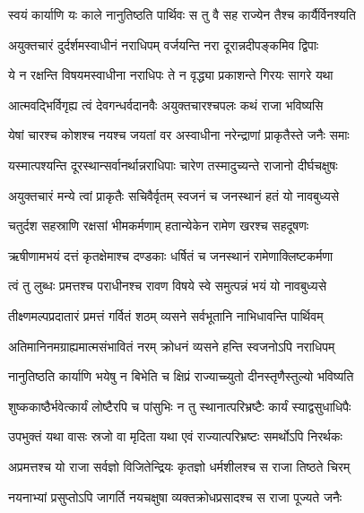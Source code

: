\twolineshloka
{स्वयं कार्याणि यः काले नानुतिष्ठति पार्थिवः}
{स तु वै सह राज्येन तैश्च कार्यैर्विनश्यति} %

\twolineshloka
{अयुक्तचारं दुर्दर्शमस्वाधीनं नराधिपम्}
{वर्जयन्ति नरा दूरान्नदीपङ्कमिव द्विपाः} %

\twolineshloka
{ये न रक्षन्ति विषयमस्वाधीना नराधिपः}
{ते न वृद्ध्या प्रकाशन्ते गिरयः सागरे यथा} %

\twolineshloka
{आत्मवद्भिर्विगृह्य त्वं देवगन्धर्वदानवैः}
{अयुक्तचारश्चपलः कथं राजा भविष्यसि} %

\twolineshloka
{येषां चारश्च कोशश्च नयश्च जयतां वर}
{अस्वाधीना नरेन्द्राणां प्राकृतैस्ते जनैः समाः} %

\twolineshloka
{यस्मात्पश्यन्ति दूरस्थान्सर्वानर्थान्नराधिपाः}
{चारेण तस्मादुच्यन्ते राजानो दीर्घचक्षुषः} %

\twolineshloka
{अयुक्तचारं मन्ये त्वां प्राकृतैः सचिवैर्वृतम्}
{स्वजनं च जनस्थानं हतं यो नावबुध्यसे} %

\twolineshloka
{चतुर्दश सहस्राणि रक्षसां भीमकर्मणाम्}
{हतान्येकेन रामेण खरश्च सहदूषणः} %

\twolineshloka
{ऋषीणामभयं दत्तं कृतक्षेमाश्च दण्डकाः}
{धर्षितं च जनस्थानं रामेणाक्लिष्टकर्मणा} %

\twolineshloka
{त्वं तु लुब्धः प्रमत्तश्च पराधीनश्च रावण}
{विषये स्वे समुत्पन्नं भयं यो नावबुध्यसे} %

\twolineshloka
{तीक्ष्णमल्पप्रदातारं प्रमत्तं गर्वितं शठम्}
{व्यसने सर्वभूतानि नाभिधावन्ति पार्थिवम्} %

\twolineshloka
{अतिमानिनमग्राह्यमात्मसंभावितं नरम्}
{क्रोधनं व्यसने हन्ति स्वजनोऽपि नराधिपम्} %

\twolineshloka
{नानुतिष्ठति कार्याणि भयेषु न बिभेति च}
{क्षिप्रं राज्याच्च्युतो दीनस्तृणैस्तुल्यो भविष्यति} %

\twolineshloka
{शुष्ककाष्ठैर्भवेत्कार्यं लोष्टैरपि च पांसुभिः}
{न तु स्थानात्परिभ्रष्टैः कार्यं स्याद्वसुधाधिपैः} %

\twolineshloka
{उपभुक्तं यथा वासः स्रजो वा मृदिता यथा}
{एवं राज्यात्परिभ्रष्टः समर्थोऽपि निरर्थकः} %

\twolineshloka
{अप्रमत्तश्च यो राजा सर्वज्ञो विजितेन्द्रियः}
{कृतज्ञो धर्मशीलश्च स राजा तिष्ठते चिरम्} %

\twolineshloka
{नयनाभ्यां प्रसुप्तोऽपि जागर्ति नयचक्षुषा}
{व्यक्तक्रोधप्रसादश्च स राजा पूज्यते जनैः} %

